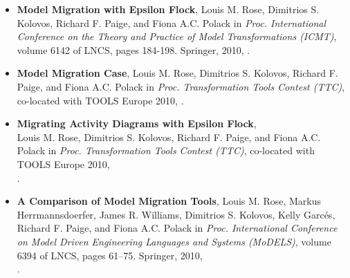 {\begin{itemize}
		\item \textbf{Model Migration with Epsilon Flock}, Louis M. Rose, Dimitrios S. Kolovos, Richard F. Paige, and Fiona A.C. Polack in \textit{Proc. International Conference on the Theory and Practice of Model Transformations (ICMT)}, volume 6142 of LNCS, pages 184-198. Springer, 2010, \cite{rose10flock}.
	
		\item \textbf{Model Migration Case}, Louis M. Rose, Dimitrios S. Ko\-lo\-vos, Richard F. Paige, and Fiona A.C. Polack in \textit{Proc. Transformation Tools Contest (TTC)}, co-located with TOOLS Europe 2010, \cite{rose10ttc_case}.
	
		\item \textbf{Migrating Activity Diagrams with Epsilon Flock}, \\ Louis M. Rose, Dimitrios S. Kolovos, Richard F. Paige, and Fiona A.C. Polack in \textit{Proc. Transformation Tools Contest (TTC)}, co-located with TOOLS Europe 2010, \\ \cite{rose10ttc_solution}.
		
		\item \textbf{A Comparison of Model Migration Tools}, Louis M. Rose, Markus Herrmannsdoerfer, James R. Williams, Dimitrios S. Kolovos, Kelly Garc\'{e}s, Richard F. Paige, and Fiona A.C. Polack in \textit{Proc. International Conference on Model Driven Engineering Languages and Systems (MoDELS)}, volume 6394 of LNCS, pages 61–75. Springer, 2010, \\
		\cite{rose10comparison}.
	\end{itemize}
}